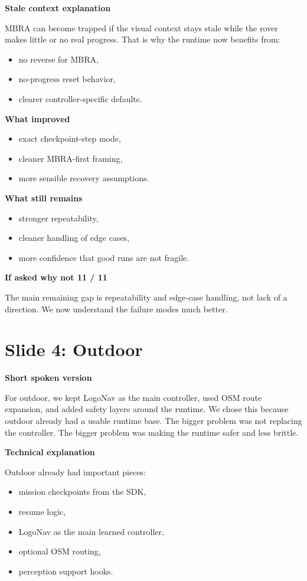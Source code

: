 \documentclass[11pt]{article}
\begin{document}
\textbf{Stale context explanation}

MBRA can become trapped if the visual context stays stale while the rover makes little or no real progress. That is why the runtime now benefits from:
\begin{itemize}[leftmargin=*]
\item no reverse for MBRA,
\item no-progress reset behavior,
\item clearer controller-specific defaults.
\end{itemize}

\textbf{What improved}
\begin{itemize}[leftmargin=*]
\item exact checkpoint-step mode,
\item cleaner MBRA-first framing,
\item more sensible recovery assumptions.
\end{itemize}

\textbf{What still remains}
\begin{itemize}[leftmargin=*]
\item stronger repeatability,
\item cleaner handling of edge cases,
\item more confidence that good runs are not fragile.
\end{itemize}

\textbf{If asked why not 11 / 11}

The main remaining gap is repeatability and edge-case handling, not lack of a direction. We now understand the failure modes much better.

\section*{Slide 4: Outdoor}
\textbf{Short spoken version}

For outdoor, we kept LogoNav as the main controller, used OSM route expansion, and added safety layers around the runtime. We chose this because outdoor already had a usable runtime base. The bigger problem was not replacing the controller. The bigger problem was making the runtime safer and less brittle.

\textbf{Technical explanation}

Outdoor already had important pieces:
\begin{itemize}[leftmargin=*]
\item mission checkpoints from the SDK,
\item resume logic,
\item LogoNav as the main learned controller,
\item optional OSM routing,
\item perception support hooks.
\end{itemize}
\end{document}

